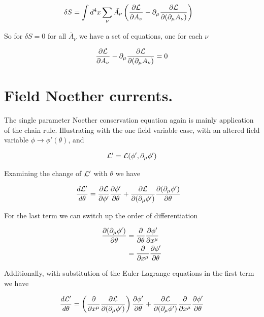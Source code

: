 \begin{align}\label{eqn:rotationCurrents:boo6}
\delta S
&=
\int d^4 x \sum_{\nu} \bar{A_\nu} \left( \PD{A_\nu}{\LL} - \partial_\mu \PD{(\partial_\mu A_\nu)}{\LL} \right)
\end{align}

So for $\delta S = 0$ for all $\bar{A}_\nu$ we have a set of equations, one for each $\nu$

\begin{align}\label{eqn:rotationCurrents:boo7}
\PD{A_\nu}{\LL} - \partial_\mu \PD{(\partial_\mu A_\nu)}{\LL} = 0
\end{align}

\section{Field Noether currents.}

The single parameter Noether conservation equation again is mainly application of the chain rule.  Illustrating with the one field variable case, with an altered field variable $\phi \rightarrow \phi'(\theta)$, and

\begin{align}\label{eqn:rotationCurrents:moo1}
\LL' = \LL(\phi', \partial_\mu \phi')
\end{align}

Examining the change of $\LL'$ with $\theta$ we have

\begin{align*}
\frac{d \LL'}{d \theta}
&=
\PD{\phi'}{\LL} \PD{\theta}{\phi'}
+\PD{(\partial_\mu \phi')}{\LL}
\PD{\theta}{(\partial_\mu \phi')}
\end{align*}

For the last term we can switch up the order of differentiation

\begin{align*}
\PD{\theta}{(\partial_\mu \phi')}
&=
\PD{\theta}{}
\PD{x^\mu}{\phi'} \\
&= \PD{x^\mu}{} \PD{\theta}{\phi'}
\end{align*}

Additionally, with substitution of the Euler-Lagrange equations in the first term we have

\begin{align*}
\frac{d \LL'}{d \theta}
&=
\left( \PD{x^\mu}{} \PD{(\partial_\mu \phi')}{\LL} \right) \PD{\theta}{\phi'}
+\PD{(\partial_\mu \phi')}{\LL} \PD{x^\mu}{} \PD{\theta}{\phi'} \\
\end{align*}

